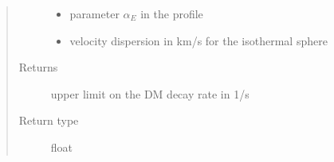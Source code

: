 \documentclass[letterpaper,10pt,english]{sphinxmanual}
\begin{document}
\begin{fulllineitems}
\begin{quote}
\begin{description}
\begin{itemize}
\item {} 
\sphinxAtStartPar
{} \textendash{} parameter \(\alpha_E\) in the {\hyperref[\detokenize{diffsph.profiles:diffsph.profiles.templates.enst}]{}} profile

\item {} 
\sphinxAtStartPar
{} \textendash{} velocity dispersion in km/s for the isothermal sphere {\hyperref[\detokenize{diffsph.profiles:diffsph.profiles.templates.sis}]{}}

\end{itemize}

\item[{Returns}] \leavevmode
\sphinxAtStartPar
upper limit on the DM decay rate in 1/s

\item[{Return type}] \leavevmode
\sphinxAtStartPar
float

\end{description}\end{quote}

\end{fulllineitems}

\end{document}
